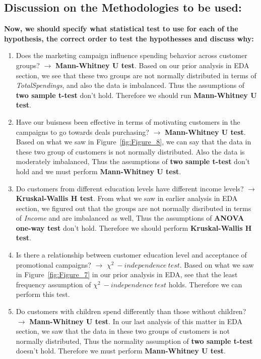 \documentclass[a4paper,12pt]{article}
\begin{document}
\subsection*{Discussion on the Methodologies to be used:}
\textbf{Now, we should specify what statistical test to use for each of the hypothesis, the correct order to test the hypothesses and discuss why:}
\begin{enumerate}
    \item Does the marketing campaign influence spending behavior across customer groups? \( \rightarrow \) \textbf{Mann-Whitney U test}. Based on our prior analysis in EDA section, 
    we see that these two groups are not normally distributed in terms of \textit{TotalSpendings}, and also the data is imbalanced. Thus the assumptions of \textbf{two sample t-test} don't hold. Therefore we should run \textbf{Mann-Whitney U test}.

    \item Have our buisness been effective in terms of motivating customers in the campaigns to go towards deals purchasing? \( \rightarrow \) \textbf{Mann-Whitney U test}. Based on what we saw in Figure~\ref{fig:Figure_8}, 
    we can say that the data in these two group of customers is not normally distributed. Also the data is moderately imbalanced, Thus the assumptions of \textbf{two sample t-test} don't hold and we must perform \textbf{Mann-Whitney U test}.

    \item Do customers from different education levels have different income levels? \( \rightarrow \) \textbf{Kruskal-Wallis H test}. From what we saw in earlier analysis in EDA section, 
    we figured out that the groups are not normally disributed in terms of \textit{Income} and are imbalanced as well, Thus the assumptions of \textbf{ANOVA one-way test} don't hold. Therefore we should perform \textbf{Kruskal-Wallis H test}.  
    
    \item Is there a relationship between customer education level and acceptance of promotional campaigns? \( \rightarrow \) \textbf{\( \chi^2\:-independence\:test \)}. Based on what we saw in Figure~\ref{fig:Figure_7} in our prior analysis in EDA, 
    see that the least frequency assumption of \textbf{\( \chi^2\:-independence\:test \)} holds. Therefore we can perform this test.

    \item Do customers with children spend differently than those without children? \( \rightarrow \) \textbf{Mann-Whitney U test}. In our last analysis of this matter in EDA section, 
    we saw that the data in these two groups of customers is not normally distributed, Thus the normality assumption of \textbf{two sample t-test} doesn't hold. Therefore we must perform \textbf{Mann-Whitney U test}.


\end{enumerate}
\end{document}
